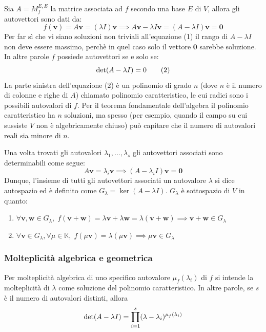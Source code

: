 \documentclass{article}
\begin{document}
    \vspace{10pt}
    Sia $A = M_{f}^{E, E}$ la matrice associata ad $f$ secondo una base $E$ di $V$, allora gli autovettori sono dati da:
    \[
        f(\mathbf{v}) = A \mathbf{v} = (\lambda I) \mathbf{v} \implies A \mathbf{v} - \lambda I \mathbf{v} = (A - \lambda I) \mathbf{v} = \mathbf{0} \tag{1}
    \] 
    Per far sì che vi siano soluzioni non triviali all'equazione (1) il rango di $A - \lambda I$ non deve essere massimo, perchè in quel caso solo il vettore $\mathbf{0}$ sarebbe soluzione.
    In altre parole $f$ possiede autovettori se e solo se:
    \[
        \textnormal{det}(A - \lambda I) = 0 \tag{2}
    \]
    La parte sinistra dell'equazione (2) è un polinomio di grado $n$ (dove $n$ è il numero di colonne e righe di $A$) chiamato polinomio caratteristico, 
    le cui radici sono i possibili autovalori di $f$. Per il teorema fondamentale dell'algebra il polinomio caratteristico ha $n$ soluzioni, ma spesso (per esempio, quando il campo su cui sussiste $V$ non è algebricamente chiuso) può capitare che 
    il numero di autovalori reali sia minore di $n$.

    \vspace{10pt}
    Una volta trovati gli autovalori $\lambda_1, ..., \lambda_s$ gli autovettori associati sono determinabili come segue:
    \[
        A \mathbf{v} = \lambda_i \mathbf{v} \implies (A - \lambda_i I) \mathbf{v} = \mathbf{0}
    \]
    Dunque, l'insieme di tutti gli autovettori associati un autovalore $\lambda$ si dice autospazio ed è definito come $G_{\lambda} = \ker(A - \lambda I)$. $G_{\lambda}$ è sottospazio di $V$ in quanto:
    \begin{enumerate}[label=(\arabic*)]
        \item $\forall \mathbf{v}, \mathbf{w} \in G_{\lambda}, \; f(\mathbf{v} + \mathbf{w}) = \lambda \mathbf{v} + \lambda \mathbf{w} = \lambda (\mathbf{v} + \mathbf{w}) \implies \mathbf{v} + \mathbf{w} \in G_{\lambda}$ 
        \item $\forall \mathbf{v} \in G_{\lambda}, \forall \mu \in \mathbb{K}, \; f(\mu \mathbf{v}) = \lambda (\mu \mathbf{v}) \implies \mu \mathbf{v} \in G_{\lambda}$
    \end{enumerate}

    \vspace{10pt} 
    \subsubsection{Molteplicità algebrica e geometrica}
    Per molteplicità algebrica di uno specifico autovalore $\mu_f(\lambda_i)$ di $f$ si intende la molteplicità di $\lambda$ come soluzione 
    del polinomio caratteristico. In altre parole, se $s$ è il numero di autovalori distinti, allora
    \[
        \textnormal{det}(A - \lambda I) = \displaystyle \prod_{i = 1}^{s} (\lambda - \lambda_i)^{\mu_f(\lambda_i)}
    \]
\end{document}
